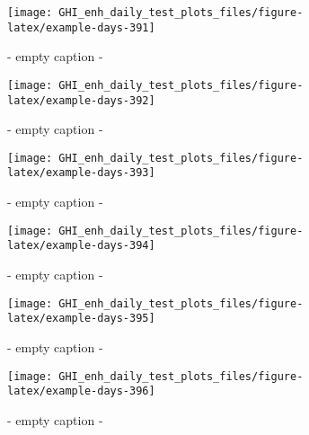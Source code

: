 \documentclass[
  10pt,
  a4paper,oneside]{article}
\begin{document}
\begin{figure}[H]

{\centering \texttt{[image: GHI\_enh\_daily\_test\_plots\_files/figure-latex/example-days-391]} 

}

\caption{ - empty caption - }\label{fig:example-days-391}
\end{figure}

\begin{figure}[H]

{\centering \texttt{[image: GHI\_enh\_daily\_test\_plots\_files/figure-latex/example-days-392]} 

}

\caption{ - empty caption - }\label{fig:example-days-392}
\end{figure}

\begin{figure}[H]

{\centering \texttt{[image: GHI\_enh\_daily\_test\_plots\_files/figure-latex/example-days-393]} 

}

\caption{ - empty caption - }\label{fig:example-days-393}
\end{figure}

\begin{figure}[H]

{\centering \texttt{[image: GHI\_enh\_daily\_test\_plots\_files/figure-latex/example-days-394]} 

}

\caption{ - empty caption - }\label{fig:example-days-394}
\end{figure}

\begin{figure}[H]

{\centering \texttt{[image: GHI\_enh\_daily\_test\_plots\_files/figure-latex/example-days-395]} 

}

\caption{ - empty caption - }\label{fig:example-days-395}
\end{figure}

\begin{figure}[H]

{\centering \texttt{[image: GHI\_enh\_daily\_test\_plots\_files/figure-latex/example-days-396]} 

}

\caption{ - empty caption - }\label{fig:example-days-396}
\end{figure}
\end{document}
